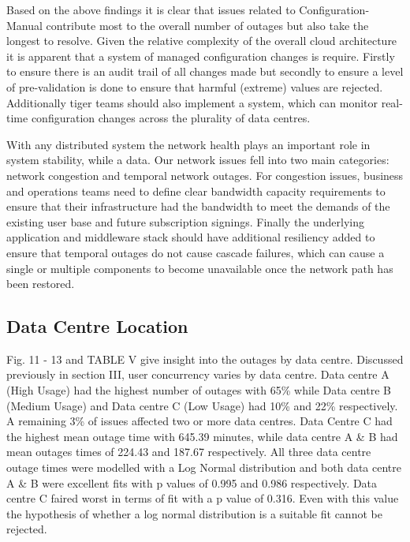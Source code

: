 \documentclass[conference]{IEEEtran}
\begin{document}
Based on the above findings it is clear that issues related to Configuration-Manual contribute most to the overall number of outages but also take the longest to resolve.  Given the relative complexity of the overall cloud architecture it is apparent that a system of managed configuration changes is require. Firstly to ensure there is an audit trail of all changes made but secondly to ensure a level of pre-validation is done to ensure that harmful (extreme) values are rejected. Additionally tiger teams should also implement a system, which can monitor real-time configuration changes across the plurality of data centres.  \par

With any distributed system the network health plays an important role in system stability, while a data. Our network issues fell into two main categories: network congestion and temporal network outages. For congestion issues, business and operations teams need to define clear bandwidth capacity requirements to ensure that their infrastructure had the bandwidth to meet the demands of the existing user base and future subscription signings. Finally the underlying application and middleware stack should have additional resiliency added to ensure that temporal outages do not cause cascade failures, which can cause a single or multiple components to become unavailable once the network path has been restored. \par


\subsection{Data Centre Location}

Fig. 11 - 13 and TABLE V give insight into the outages by data centre. Discussed previously in section III, user concurrency varies by data centre. Data centre A (High Usage) had the highest number of outages with 65\% while Data centre B (Medium Usage) and Data centre C (Low Usage) had 10\% and 22\% respectively. A remaining 3\% of issues affected two or more data centres. Data Centre C had the highest mean outage time with 645.39 minutes, while data centre A \& B had mean outages times of 224.43 and 187.67 respectively. All three data centre outage times were modelled with a Log Normal distribution and both data centre A \& B were excellent fits with p values of 0.995 and 0.986 respectively. Data centre C faired worst in terms of fit with a p value of 0.316. Even with this value the hypothesis of whether a log normal distribution is a suitable fit cannot be rejected. \par
\end{document}
